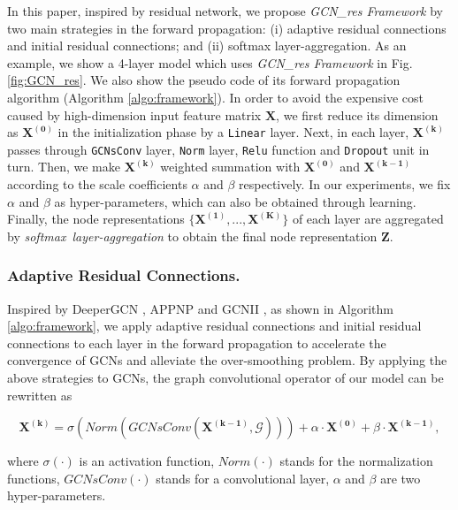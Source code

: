 \documentclass[runningheads]{llncs}
\begin{document}
In this paper, inspired by residual network, we
propose \textsl{GCN\_res Framework} by two main strategies in the forward propagation: (i) adaptive residual connections and initial residual connections; and (ii) softmax layer-aggregation. As an example, we show a 4-layer model which uses \textsl{GCN\_res Framework} in Fig. \ref{fig:GCN_res}. We also show the pseudo code of its forward propagation algorithm (Algorithm \ref{algo:framework}). In order to avoid the
expensive cost caused by high-dimension 
input feature matrix $\bm{X}$, we first reduce its dimension as $\bm{X^{(0)}}$ in the initialization phase by a \texttt{Linear} layer. Next, in each layer, \(\bm{X^{(k)}}\) passes through
\texttt{GCNsConv} layer, \texttt{Norm} layer, \texttt{Relu} function and \texttt{Dropout} unit
in turn. Then, we make $\bm{X^{(k)}}$ weighted summation with \(\bm{X^{(0)}}\) and \(\bm{X^{(k-1)}}\) according to the scale coefficients \(\alpha\) and \(\beta\) respectively. In our experiments, we fix
\(\alpha\) and \(\beta\) as hyper-parameters, which can also be obtained through learning. Finally, the node
representations \(\{\bm{X^{(1)}},...,\bm{X^{(K)}}\}\) of each layer are
aggregated by \textsl{softmax\ layer-aggregation} to obtain the final node representation $\bm{Z}$.



\subsubsection{Adaptive Residual Connections.} Inspired by DeeperGCN \cite{li2020deepergcn}, APPNP \cite{klicpera2018predict} and GCNII \cite{chen2020simple}, as shown in Algorithm \ref{algo:framework}, we apply adaptive residual connections and
initial residual connections to each layer in the forward
propagation to accelerate the convergence of GCNs and
alleviate the over-smoothing problem. By applying the above strategies to GCNs, the graph convolutional operator of our model can be rewritten as 

\begin{equation}
\label{equ:res}
\bm{X^{(k)}}=\sigma \left( Norm \left(GCNsConv\left(\bm{X^{(k-1)}},\mathcal{G}\right)\right)\right)+\alpha \cdot \bm{X^{(0)}} + \beta \cdot \bm{X^{(k-1)}},
\end{equation}



where $\sigma(\cdot)$ is an activation function, $Norm(\cdot)$ stands for the normalization functions, $GCNsConv(\cdot)$ stands for a convolutional layer, $\alpha$ and $\beta$ are two hyper-parameters.
\end{document}
